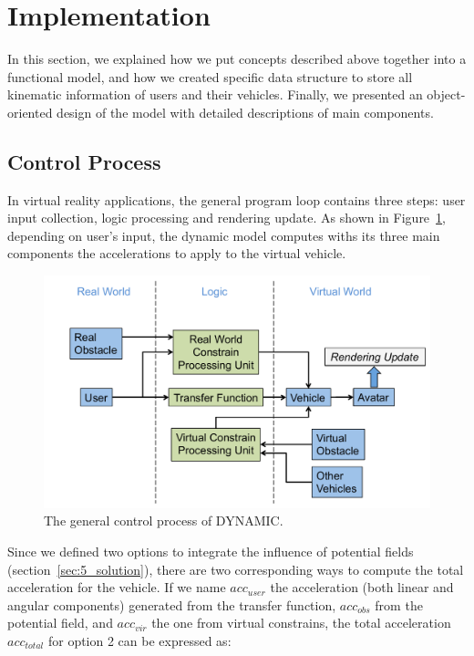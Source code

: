 
\section{Implementation}
In this section, we explained how we put concepts described above together into a functional model, and how we created specific data structure to store all kinematic information of users and their vehicles. Finally, we presented an object-oriented design of the model with detailed descriptions of main components.

\subsection{Control Process}
In virtual reality applications, the general program loop contains three steps: user input collection, logic processing and rendering update. As shown in Figure~\ref{fig:5_process}, depending on user's input, the dynamic model computes withs its three main components the accelerations to apply to the virtual vehicle.

\begin{figure}[htb]
  \centering
  \includegraphics[width=.9\textwidth]{figures/ch5/process}
  \caption{\label{fig:5_process}The general control process of DYNAMIC.}
\end{figure}

Since we defined two options to integrate the influence of potential fields (section~\ref{sec:5_solution}), there are two corresponding ways to compute the total acceleration for the vehicle. If we name $acc_{user}$ the acceleration (both linear and angular components) generated from the transfer function, $acc_{obs}$ from the potential field, and $acc_{vir}$ the one from virtual constrains, the total acceleration $acc_{total}$ for option 2 can be expressed as:

